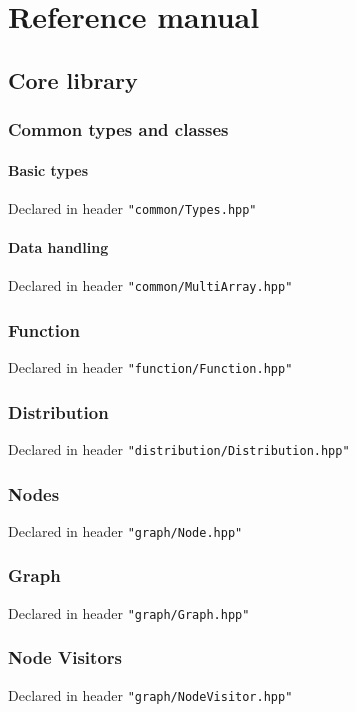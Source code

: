 \chapter{Reference manual}
\label{reference}

\section{\biips Core library}

\subsection{Common types and classes}

\subsubsection{Basic types}
Declared in header \texttt{"common/Types.hpp"}

\subsubsection{Data handling}
Declared in header \texttt{"common/MultiArray.hpp"}

\subsection{Function}
Declared in header \texttt{"function/Function.hpp"}

\subsection{Distribution}
Declared in header \texttt{"distribution/Distribution.hpp"}

\subsection{Nodes}
Declared in header \texttt{"graph/Node.hpp"}

\subsection{Graph}
Declared in header \texttt{"graph/Graph.hpp"}

\subsection{Node Visitors}
Declared in header \texttt{"graph/NodeVisitor.hpp"}

